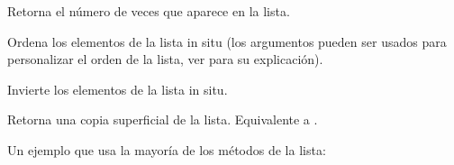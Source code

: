 \documentclass[a5paper,10pt,spanish]{sphinxmanual}
\begin{document}
\begin{fulllineitems}
\sphinxAtStartPar
Retorna el número de veces que  aparece en la lista.

\end{fulllineitems}



\begin{fulllineitems}
\sphinxAtStartPar
Ordena los elementos de la lista in situ (los argumentos pueden ser usados para personalizar el orden de la lista, ver  para su explicación).

\end{fulllineitems}



\begin{fulllineitems}
\sphinxAtStartPar
Invierte los elementos de la lista in situ.

\end{fulllineitems}



\begin{fulllineitems}
\sphinxAtStartPar
Retorna una copia superficial de la lista. Equivalente a .

\end{fulllineitems}


\sphinxAtStartPar
Un ejemplo que usa la mayoría de los métodos de la lista:
\end{document}
